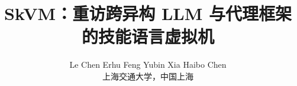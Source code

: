 \documentclass[10pt,twocolumn]{article}
\begin{document}
\date{}

\title{\Large\textbf{SkVM：重访跨异构 LLM 与代理框架的技能语言虚拟机}}
\author{Le Chen \quad Erhu Feng \quad Yubin Xia \quad Haibo Chen\\
\normalsize 上海交通大学，中国上海}

\newcommand{\myparagraph}[1]{\vspace {3pt}\noindent\textbf{\emph{#1}}}
\newcommand{\sys}{\textsc{SkVM}\xspace}
\newcommand{\heading}[1]{
\vspace{1ex}
\noindent
\textbf{#1}
}
\newenvironment{myitemize}%
  {\begin{list}{\labelitemi}{\itemsep1pt \topsep2pt \parsep0.00in
  \partopsep=0pt \leftmargin1em}}%
  {\end{list}}

\maketitle












\end{document}
